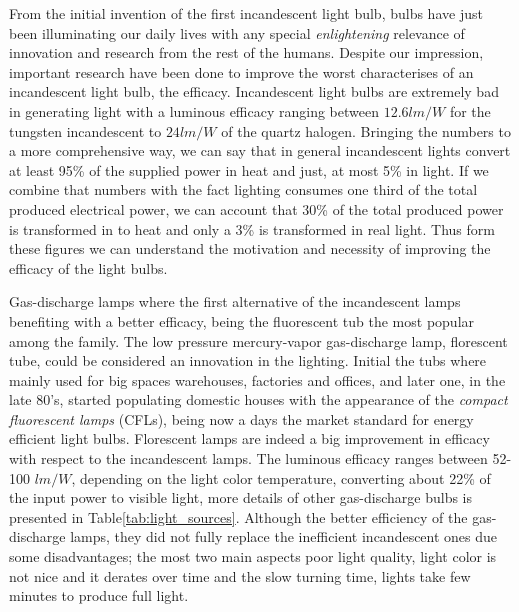 From the initial invention of the first incandescent light bulb,  bulbs have just been illuminating our daily lives with any special \emph{enlightening} relevance of innovation and research from the rest of the humans. Despite our impression,  important research have been done to improve the worst characterises of an incandescent light bulb, the efficacy. Incandescent light bulbs are extremely bad in generating light with a luminous efficacy ranging between $12.6 lm/W$ for the tungsten incandescent to $24 lm/W$ of the quartz halogen. Bringing the numbers to a more comprehensive way, we can say that in general incandescent lights convert at least 95\% of the supplied power in heat and just, at most 5\% in light. If we combine that numbers with the fact lighting consumes one third of the total produced electrical power, we can account that 30\% of the total produced power is transformed in to heat and only a 3\% is transformed in real light. Thus form these figures we can understand  the motivation and necessity of improving the efficacy of the light bulbs.

Gas-discharge lamps where the first alternative of the incandescent lamps benefiting with a better efficacy, being the fluorescent tub the most popular among the family. The low pressure mercury-vapor gas-discharge  lamp, florescent tube, could be considered an innovation in the lighting. Initial the tubs where mainly used for big spaces warehouses, factories and offices, and later one, in the late 80's, started populating domestic houses with the appearance of the \emph{compact fluorescent lamps} (CFLs), being now a days the market standard for energy efficient light bulbs. Florescent lamps are indeed a big improvement in efficacy with respect to the incandescent lamps. The luminous efficacy ranges between 52-100 $lm/W$, depending on the light color temperature, converting about 22\% of the input power to visible light, more details of other gas-discharge bulbs is presented in Table\ref{tab:light_sources}. Although the better efficiency of the gas-discharge lamps, they did not fully replace the inefficient incandescent ones due some disadvantages; the most two main aspects poor light quality, light color is not nice and it derates over time and the slow turning time, lights take few minutes to produce full light.

